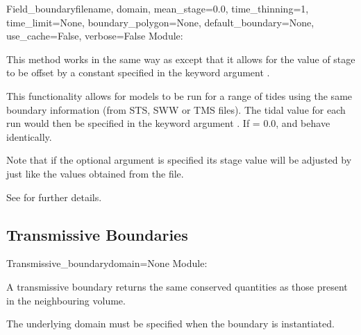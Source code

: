 \documentclass{manual}
\begin{document}
\begin{classdesc}{Field_boundary}{filename,
                                  domain,
                                  mean_stage=0.0,
                                  time_thinning=1,
                                  time_limit=None,
                                  boundary_polygon=None,
                                  default_boundary=None,
                                  use_cache=False,
                                  verbose=False}
Module: 

This method works in the same way as  except that it
allows for the value of stage to be offset by a constant specified in the
keyword argument .

This functionality allows for models to be run for a range of tides using
the same boundary information (from STS, SWW or TMS files). The tidal value
for each run would then be specified in the keyword argument .
If  = 0.0,  and 
behave identically.

Note that if the optional argument  is specified
its stage value will be adjusted by  just like the values
obtained from the file.

See  for further details.
\end{classdesc}


\subsection{Transmissive Boundaries}

\begin{classdesc}{Transmissive_boundary}{domain=None}
  \label{pg: transmissive boundary}
Module: 

A transmissive boundary returns the same conserved quantities as
those present in the neighbouring volume.

The underlying domain must be specified when the boundary is instantiated.
\end{classdesc}
\end{document}
